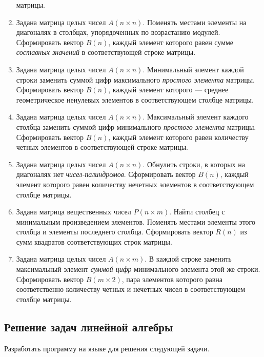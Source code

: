 \begin{enumerate}
матрицы.
\item Задана матрица целых чисел $A(n\times n)$. Поменять местами элементы на диагоналях в столбцах,
упорядоченных по возрастанию модулей. Сформировать вектор $B(n)$, каждый элемент которого
равен сумме \emph{составных значений} в соответствующей строке матрицы.
\item Задана матрица целых чисел $A(n\times n)$. Минимальный элемент каждой строки заменить суммой
цифр максимального \emph{простого элемента} матрицы. Сформировать вектор $B(n)$,
каждый элемент которого --- среднее геометрическое ненулевых элементов в соответствующем столбце матрицы.
\item Задана матрица целых чисел $A(n\times n)$. Максимальный элемент каждого столбца заменить суммой
цифр минимального \emph{простого элемента} матрицы. Сформировать вектор $B(n)$,
каждый элемент которого равен количеству четных элементов в соответствующей строке матрицы.
\item Задана матрица целых чисел $A(n\times n)$. Обнулить строки, в которых на диагоналях нет
\emph{чисел-палиндромов}. Сформировать вектор $B(n)$, каждый
элемент которого равен количеству нечетных элементов в соответствующем столбце матрицы.
\item Задана матрица вещественных чисел $P(n\times m)$. Найти столбец с минимальным
произведением элементов. Поменять местами элементы этого столбца и элементы последнего столбца. Сформировать вектор
$R(n)$ из сумм квадратов соответствующих строк матрицы.
\item Задана матрица целых чисел $A(n\times m)$. В каждой строке заменить максимальный
элемент \emph{суммой цифр} минимального элемента этой же строки. Сформировать вектор
$B(m\times 2)$, пара элементов которого равна соответственно количеству четных и
нечетных чисел в соответствующем столбце матрицы.
\end{enumerate}

\subsection[Решение задач линейной алгебры]{Решение задач линейной алгебры}
Разработать программу на языке  для решения следующей задачи.

